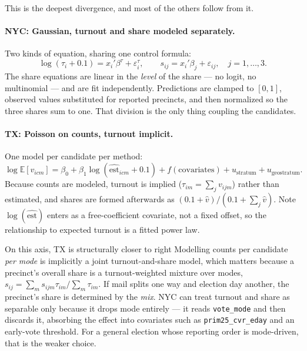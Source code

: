 \documentclass[11pt]{article}
\begin{document}
This is the deepest divergence, and most of the others follow from it.

\paragraph{NYC: Gaussian, turnout and share modeled separately.} Two kinds of equation,
sharing one control formula:
\begin{equation}
  \log(\tau_i + 0.1) = x_i'\beta^{\tau} + \varepsilon^{\tau}_i,
  \qquad
  s_{ij} = x_i'\beta_j + \varepsilon_{ij}, \quad j = 1,\dots,3 .
  \label{eq:nyc}
\end{equation}
The share equations are linear in the \emph{level} of the share --- no logit, no
multinomial --- and are fit independently. Predictions are clamped to $[0,1]$, observed
values substituted for reported precincts, and then normalized so the three shares sum to
one. That division is the only thing coupling the candidates.

\paragraph{TX: Poisson on counts, turnout implicit.} One model per candidate per method:
\begin{equation}
  \log \mathbb{E}[v_{icm}] = \beta_0 + \beta_1 \log(\widehat{\textrm{est}}_{icm} + 0.1)
  + f(\textrm{covariates}) + u_{\textrm{stratum}} + u_{\textrm{geostratum}} .
  \label{eq:tx}
\end{equation}
Because counts are modeled, turnout is implied ($\tau_{im} = \sum_j v_{ijm}$) rather than
estimated, and shares are formed afterwards as $(0.1 + \hat v)/(0.1 + \sum_j \hat v)$.
Note $\log(\widehat{\textrm{est}})$ enters as a free-coefficient covariate, not a fixed
offset, so the relationship to expected turnout is a fitted power law.

\begin{memobox}{On this axis, TX is structurally closer to right}
Modelling counts per candidate \emph{per mode} is implicitly a joint turnout-and-share
model, which matters because a precinct's overall share is a turnout-weighted mixture over
modes, $s_{ij} = \sum_m s_{ijm}\tau_{im} / \sum_m \tau_{im}$. If mail splits one way and
election day another, the precinct's share is determined by the \emph{mix}. NYC can treat
turnout and share as separable only because it drops mode entirely --- it reads
\texttt{vote\_mode} and then discards it, absorbing the effect into covariates such as
\texttt{prim25\_cvr\_eday} and an early-vote threshold. For a general election whose
reporting order is mode-driven, that is the weaker choice.
\end{memobox}
\end{document}
